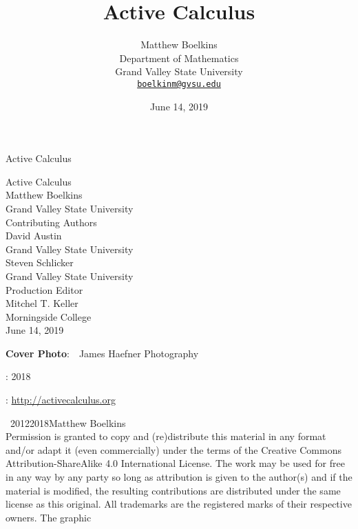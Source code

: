 \documentclass[10pt,]{book}
\title{Active Calculus}
\author{Matthew Boelkins\\
Department of Mathematics\\
Grand Valley State University\\
\href{mailto:boelkinm@gvsu.edu}{\nolinkurl{boelkinm@gvsu.edu}}
}
\date{June 14, 2019}
\theoremstyle{plain}
\theoremstyle{definition}
\theoremstyle{definition}
\theoremstyle{definition}
\theoremstyle{definition}
\numberwithin{equation}{section}
\begin{document}
\frontmatter
\thispagestyle{empty}
{\centering
\vspace*{0.28\textheight}
{\Huge Active Calculus}\\}
\clearpage
\thispagestyle{empty}
\null%
\clearpage
\thispagestyle{empty}
{\centering
\vspace*{0.14\textheight}
{\Huge Active Calculus}\\[3\baselineskip]
{\Large Matthew Boelkins}\\[0.5\baselineskip]
{\Large Grand Valley State University}\\[3\baselineskip]
{\Large Contributing Authors}\\[0.5\baselineskip]
{\normalsize David Austin}\\[0.25\baselineskip]
Grand Valley State University\\[0.5\baselineskip]

{\normalsize Steven Schlicker}\\[0.25\baselineskip]
Grand Valley State University\\
[3\baselineskip]
{\Large Production Editor}\\[0.5\baselineskip]
{\normalsize Mitchel T. Keller}\\[0.25\baselineskip]
Morningside College\\
[3\baselineskip]
{\Large June 14, 2019}\\}
\clearpage
\thispagestyle{empty}
\hypertarget{colophon-1}{}
\par\noindent
\textbf{Cover Photo}:\ \ James Haefner Photography
\par{}
: 2018\par\medskip
{}: \href{http://activecalculus.org}{http://activecalculus.org}\par\medskip
\noindent\textcopyright\ 2012\textendash{}2018\quad{}Matthew Boelkins\\[0.5\baselineskip]
Permission is granted to copy and (re)distribute this material in any format and/or adapt it (even commercially) under the terms of the Creative Commons Attribution-ShareAlike 4.0 International License.  The work may be used for free in any way by any party so long as attribution is given to the author(s) and if the material is modified, the resulting contributions are distributed under the same license as this original.  All trademarks\texttrademark{} are the registered\textregistered{} marks of their respective owners. The graphic %
\end{document}
